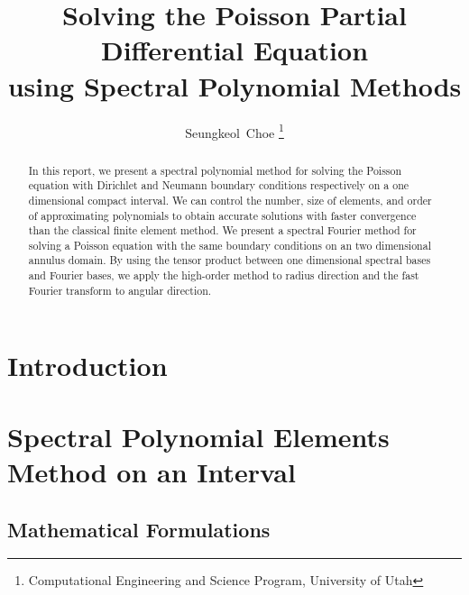 \documentclass[11pt, notitlepage,  letterpaper]{article}
\begin{document}
\title{
{Solving the Poisson Partial Differential Equation}\\
{using Spectral Polynomial Methods }
}

 \vfill
\author{Seungkeol\ Choe \thanks{Computational Engineering and Science Program, University of Utah}}

\renewcommand{\today}{April 18th, 2004}

\maketitle

\begin{abstract}
In this report, we present a spectral polynomial method for
solving the Poisson equation with Dirichlet and Neumann boundary
conditions respectively on a one dimensional compact interval. We
can control the number, size of elements, and order of
approximating polynomials to obtain accurate solutions with faster
convergence than the classical finite element method. We present a
spectral Fourier method for solving a Poisson equation with the
same boundary conditions on an two dimensional annulus domain. By
using the tensor product between one dimensional spectral bases
and Fourier bases, we apply the high-order method to radius
direction and the fast Fourier transform to angular direction.
\end{abstract}

\clearpage

\tableofcontents

\clearpage


\section{Introduction}


\clearpage
\section{Spectral Polynomial Elements Method on an Interval}

\subsection{Mathematical Formulations}

\end{document}
